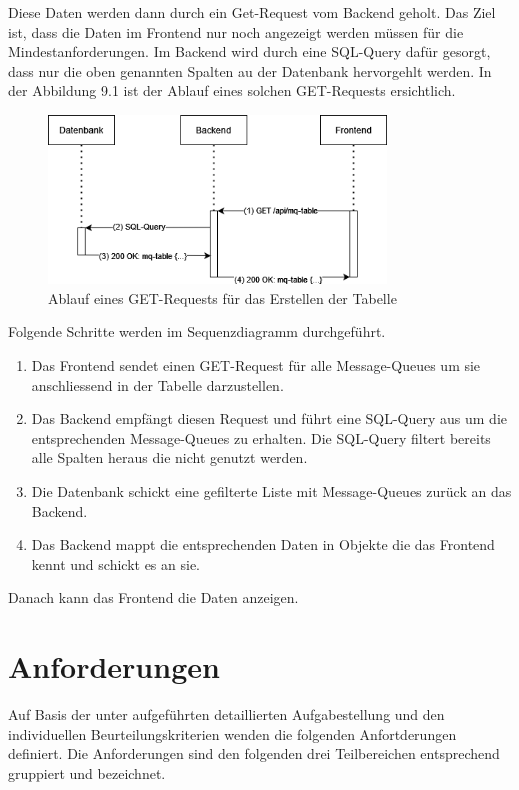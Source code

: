 \newpage
Diese Daten werden dann durch ein Get-Request vom Backend geholt. Das Ziel ist, dass die Daten im Frontend nur noch angezeigt werden müssen für die Mindestanforderungen. Im Backend wird durch eine SQL-Query dafür gesorgt, dass nur die oben genannten Spalten au der Datenbank hervorgehlt werden. In der Abbildung 9.1 ist der Ablauf eines solchen GET-Requests ersichtlich.

\begin{figure}[H]
	\begin{center}
		\includegraphics[width=0.8\textwidth]{ressourcen/Sequenzendiagramm}
		\caption[Ablauf eines GET-Requests für das Erstellen der Tabelle]{Ablauf eines GET-Requests für das Erstellen der Tabelle}\label{fig:get-request-for-creation-of-table}
	\end{center}
\end{figure}

Folgende Schritte werden im Sequenzdiagramm durchgeführt.
\begin{enumerate}
	\item Das Frontend sendet einen GET-Request für alle Message-Queues um sie anschliessend in der Tabelle darzustellen.
	\item Das Backend empfängt diesen Request und führt eine SQL-Query aus um die entsprechenden Message-Queues zu erhalten. Die SQL-Query filtert bereits alle Spalten heraus die nicht genutzt werden.
	\item Die Datenbank schickt eine gefilterte Liste mit Message-Queues zurück an das Backend.
	\item Das Backend mappt die entsprechenden Daten in Objekte die das Frontend kennt und schickt es an sie.
\end{enumerate}

Danach kann das Frontend die Daten anzeigen.
\newpage
\section{Anforderungen}
Auf Basis der unter  aufgeführten detaillierten Aufgabestellung und den individuellen Beurteilungskriterien wenden die folgenden Anfortderungen definiert. Die Anforderungen sind den folgenden drei Teilbereichen entsprechend gruppiert und bezeichnet.

